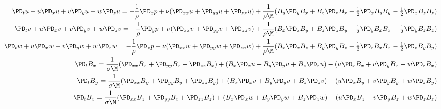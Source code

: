 \documentclass[11pt]{article}
\begin{document}
\tiny\begin{equation}\begin{aligned}
\PD_t u+ u\PD_x u + v\PD_y u + w\PD_z u = -\frac{1}{\rho}\PD_x p+ \nu (\PD_{xx} u+\PD_{yy} u+\PD_{zz} u) + \frac{1}{\rho \M} (B_y \PD_y B_x + B_z \PD_z B_x-\tfrac{1}{2}\PD_x B_y B_y-\tfrac{1}{2}\PD_x B_z B_z) \\
\PD_t v+ u\PD_x v + v\PD_y v + w\PD_z v = -\frac{1}{\rho}\PD_y p+ \nu (\PD_{xx} v+\PD_{yy} v+\PD_{zz} v) + \frac{1}{\rho \M} (B_x \PD_x B_y + B_z \PD_z B_y-\tfrac{1}{2}\PD_y B_x B_x-\tfrac{1}{2}\PD_y B_z B_z) \\
\PD_t w+ u\PD_x w + v\PD_y w + w\PD_z w = -\frac{1}{\rho}\PD_z p+ \nu (\PD_{xx} w+\PD_{yy} w+\PD_{zz} w) + \frac{1}{\rho \M} (B_x \PD_x B_z + B_y \PD_y B_z-\tfrac{1}{2}\PD_z B_x B_x-\tfrac{1}{2}\PD_z B_y B_y) \\
\PD_t B_x = \frac{1}{\sigma \M} (\PD_{xx} B_x + \PD_{yy} B_x+\PD_{zz} B_x) + (B_x\PD_x u+B_y\PD_y u+B_z\PD_z u) - (u\PD_x B_x+v\PD_y B_x+w\PD_z B_x) \\
\PD_t B_y = \frac{1}{\sigma \M} (\PD_{xx} B_y + \PD_{yy} B_y+\PD_{zz} B_y) + (B_x\PD_x v+B_y\PD_y v+B_z\PD_z v) - (u\PD_x B_y+v\PD_y B_y+w\PD_z B_y) \\
\PD_t B_z = \frac{1}{\sigma \M} (\PD_{xx} B_z + \PD_{yy} B_z+\PD_{zz} B_z) + (B_x\PD_x w+B_y\PD_y w+B_z\PD_z w) - (u\PD_x B_z+v\PD_y B_z+w\PD_z B_z) \\
\end{aligned} \end{equation}\normalsize
\end{document}
